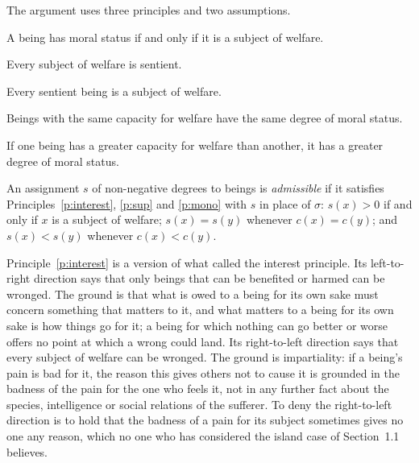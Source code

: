 \documentclass{situationist-preprint}
\begin{document}
The argument uses three principles and two assumptions.

\begin{principle}\label{p:interest}
A being has moral status if and only if it is a subject of welfare.
\end{principle}

\begin{assumption}\label{a:exp}
Every subject of welfare is sentient.
\end{assumption}

\begin{assumption}\label{a:val}
Every sentient being is a subject of welfare.
\end{assumption}

\begin{principle}[Supervenience]\label{p:sup}
Beings with the same capacity for welfare have the same degree of moral status.
\end{principle}

\begin{principle}[Monotonicity]\label{p:mono}
If one being has a greater capacity for welfare than another, it has a greater degree of moral status.
\end{principle}

\begin{definition}\label{d:admissible}
An assignment $s$ of non-negative degrees to beings is \emph{admissible} if it satisfies Principles~\ref{p:interest}, \ref{p:sup} and \ref{p:mono} with $s$ in place of $\sigma$: $s(x) > 0$ if and only if $x$ is a subject of welfare; $s(x) = s(y)$ whenever $c(x) = c(y)$; and $s(x) < s(y)$ whenever $c(x) < c(y)$.
\end{definition}

Principle~\ref{p:interest} is a version of what \citet{Feinberg1974} called the interest principle. Its left-to-right direction says that only beings that can be benefited or harmed can be wronged. The ground is that what is owed to a being for its own sake must concern something that matters to it, and what matters to a being for its own sake is how things go for it; a being for which nothing can go better or worse offers no point at which a wrong could land. Its right-to-left direction says that every subject of welfare can be wronged. The ground is impartiality: if a being's pain is bad for it, the reason this gives others not to cause it is grounded in the badness of the pain for the one who feels it, not in any further fact about the species, intelligence or social relations of the sufferer. To deny the right-to-left direction is to hold that the badness of a pain for its subject sometimes gives no one any reason, which no one who has considered the island case of Section~1.1 believes.
\end{document}
